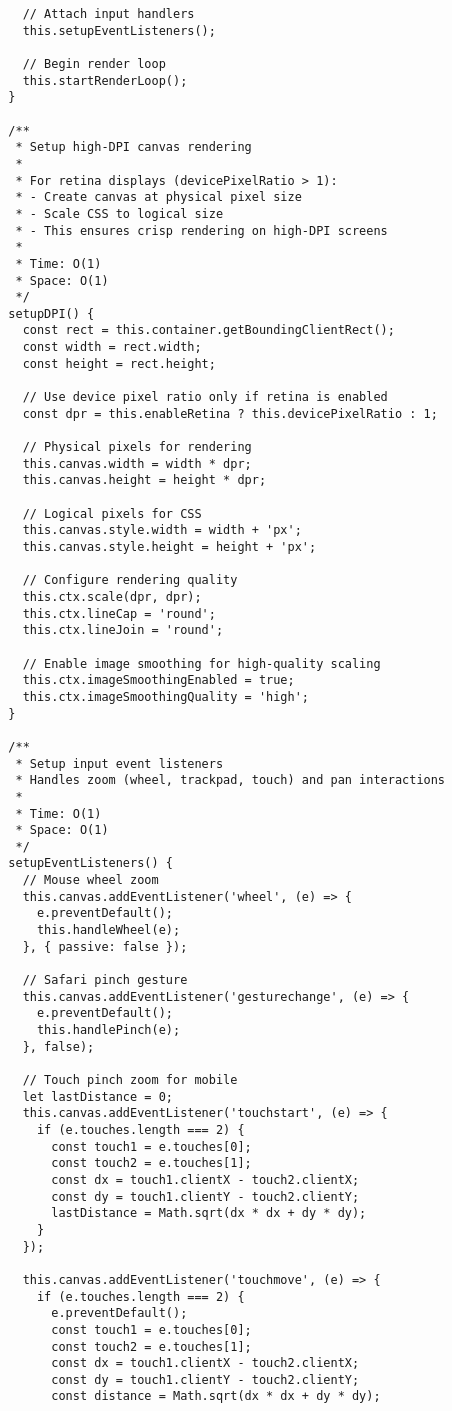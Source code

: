 \documentclass[11pt]{article}
\begin{document}
\begin{verbatim}
    // Attach input handlers
    this.setupEventListeners();
    
    // Begin render loop
    this.startRenderLoop();
  }
  
  /**
   * Setup high-DPI canvas rendering
   * 
   * For retina displays (devicePixelRatio > 1):
   * - Create canvas at physical pixel size
   * - Scale CSS to logical size
   * - This ensures crisp rendering on high-DPI screens
   * 
   * Time: O(1)
   * Space: O(1)
   */
  setupDPI() {
    const rect = this.container.getBoundingClientRect();
    const width = rect.width;
    const height = rect.height;
    
    // Use device pixel ratio only if retina is enabled
    const dpr = this.enableRetina ? this.devicePixelRatio : 1;
    
    // Physical pixels for rendering
    this.canvas.width = width * dpr;
    this.canvas.height = height * dpr;
    
    // Logical pixels for CSS
    this.canvas.style.width = width + 'px';
    this.canvas.style.height = height + 'px';
    
    // Configure rendering quality
    this.ctx.scale(dpr, dpr);
    this.ctx.lineCap = 'round';
    this.ctx.lineJoin = 'round';
    
    // Enable image smoothing for high-quality scaling
    this.ctx.imageSmoothingEnabled = true;
    this.ctx.imageSmoothingQuality = 'high';
  }
  
  /**
   * Setup input event listeners
   * Handles zoom (wheel, trackpad, touch) and pan interactions
   * 
   * Time: O(1)
   * Space: O(1)
   */
  setupEventListeners() {
    // Mouse wheel zoom
    this.canvas.addEventListener('wheel', (e) => {
      e.preventDefault();
      this.handleWheel(e);
    }, { passive: false });
    
    // Safari pinch gesture
    this.canvas.addEventListener('gesturechange', (e) => {
      e.preventDefault();
      this.handlePinch(e);
    }, false);
    
    // Touch pinch zoom for mobile
    let lastDistance = 0;
    this.canvas.addEventListener('touchstart', (e) => {
      if (e.touches.length === 2) {
        const touch1 = e.touches[0];
        const touch2 = e.touches[1];
        const dx = touch1.clientX - touch2.clientX;
        const dy = touch1.clientY - touch2.clientY;
        lastDistance = Math.sqrt(dx * dx + dy * dy);
      }
    });
    
    this.canvas.addEventListener('touchmove', (e) => {
      if (e.touches.length === 2) {
        e.preventDefault();
        const touch1 = e.touches[0];
        const touch2 = e.touches[1];
        const dx = touch1.clientX - touch2.clientX;
        const dy = touch1.clientY - touch2.clientY;
        const distance = Math.sqrt(dx * dx + dy * dy);
        

\end{verbatim}
\end{document}
